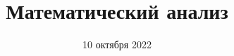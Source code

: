 


    \title{Математический анализ}
    \date{10 октября 2022}
    \maketitle

    \pagebreak

    

